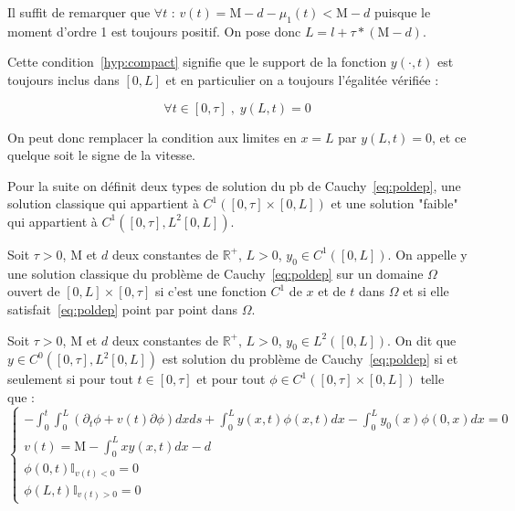 \documentclass[a4paper]{article}
\newcommand{\mass}{\mathrm{M}}
\newcommand{\dep}{d}
\begin{document}
\begin{preuve}
	Il suffit de remarquer que $\forall t$ :
	$v(t) = \mass - \dep - \mu_1 (t) < \mass - \dep $
	puisque le moment d'ordre 1 est toujours positif.
	On pose donc $L = l + \tau*(\mass-\dep)$.
\end{preuve}

Cette condition~\eqref{hyp:compact} signifie que le support de la fonction $y( \cdot,t)$ est toujours inclus dans $[0,L]$ et en particulier on a toujours l'égalitée vérifiée : 

\[ \forall t \in [0,\tau] \;, \; y(L,t) =0\]

On peut donc remplacer la condition aux limites en $x=L$ par $y(L,t)=0$, et ce quelque soit le signe de la vitesse.

Pour la suite on définit deux types de solution du pb de Cauchy~\eqref{eq:poldep}, une solution classique qui appartient à $C^1([0,\tau]\times[0,L])$ 
et une solution "faible" qui appartient à $C^1([0,\tau],L^2[0,L])$.

\begin{definition}
	Soit $\tau>0$, $\mass$ et $\dep$ deux constantes de $\mathbb{R}^+$, $L>0$, $y_0 \in C^1([0,L])$.
	On appelle y une solution classique du problème de Cauchy~\eqref{eq:poldep} 
	sur un domaine $\Omega$ ouvert de $[0,L] \times [0, \tau]$ 
	si c'est une fonction $C^1$ de $x$ et de $t$ dans $\Omega$ 
	et si elle satisfait~\eqref{eq:poldep} point par point dans $\Omega$.
\end{definition}

\begin{definition}
	\label{def:cauchy}
	Soit $\tau>0$, $\mass$ et $\dep$ deux constantes de $\mathbb{R}^+$, 
	$L>0$, $y_0 \in L^2([0,L])$.
	On dit que $y \in C^0([0,\tau],L^2[0,L])$ est solution du problème de Cauchy~\eqref{eq:poldep}  
	si et seulement si pour tout $t \in [0,\tau]$ et pour
	tout $\phi \in C^1([0,\tau]\times [0,L])$ telle que :
	\begin{equation}
		\begin{cases}
			-\int_0^t \int_0^L (\partial_t \phi +v(t)\partial \phi) dxds 
			+ \int_0^L y(x,t) \phi (x,t) dx - \int_0^L y_0(x)\phi(0,x)dx =0 \\
			v(t) = \mass - \int_0^L xy(x,t)dx -\dep\\
			\phi(0,t) \mathbb{I}_{v(t)<0}=0 \\
			\phi(L,t) \mathbb{I}_{v(t)>0}=0 
		\end{cases}
	\end{equation}
\end{definition}
\end{document}
